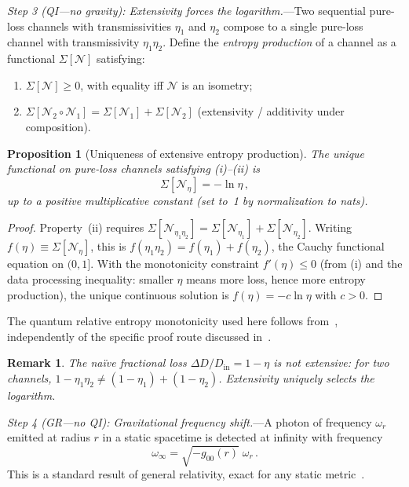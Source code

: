 \documentclass[aps,prd,preprint,superscriptaddress,longbibliography]{revtex4-2}
\newtheorem{proposition}[theorem]{Proposition}
\newtheorem*{remark}{Remark}
\newcommand{\chan}{\mathcal{N}}
\begin{document}
\emph{Step 3 (QI---no gravity): Extensivity forces the
logarithm.}---Two sequential pure-loss channels with
transmissivities $\eta_1$ and $\eta_2$ compose to a single
pure-loss channel with transmissivity $\eta_1\eta_2$.
Define the \emph{entropy production} of a channel as a functional
$\Sigma[\chan]$ satisfying:
\begin{enumerate}
  \item[(i)] $\Sigma[\chan] \geq 0$, with equality iff
    $\chan$ is an isometry;
  \item[(ii)] $\Sigma[\chan_2\circ\chan_1]
    = \Sigma[\chan_1] + \Sigma[\chan_2]$
    (extensivity / additivity under composition).
\end{enumerate}
\begin{proposition}[Uniqueness of extensive entropy production]
\label{prop:extensivity}
The unique functional on pure-loss channels satisfying (i)--(ii) is
\begin{equation}
  \Sigma[\chan_\eta] = -\ln\eta\,,
  \label{eq:Sigma_unique}
\end{equation}
up to a positive multiplicative constant (set to~1 by
normalization to nats).
\end{proposition}
\begin{proof}
Property~(ii) requires $\Sigma[\chan_{\eta_1\eta_2}]
= \Sigma[\chan_{\eta_1}] + \Sigma[\chan_{\eta_2}]$.
Writing $f(\eta) \equiv \Sigma[\chan_\eta]$, this is
$f(\eta_1\eta_2) = f(\eta_1) + f(\eta_2)$, the Cauchy
functional equation on $(0,1]$.  With the monotonicity
constraint $f'(\eta) \leq 0$ (from (i) and the data
processing inequality: smaller $\eta$ means more loss,
hence more entropy production), the unique continuous
solution is $f(\eta) = -c\ln\eta$ with $c > 0$.
\end{proof}

The quantum relative entropy monotonicity used here follows from~\cite{Lindblad1975,Uhlmann1977}, independently of the specific proof route discussed in~\cite{Petz1988}.

\begin{remark}
The na\"ive fractional loss $\Delta D/D_{\mathrm{in}} = 1 - \eta$
is \emph{not} extensive: for two channels,
$1 - \eta_1\eta_2 \neq (1-\eta_1) + (1-\eta_2)$.
Extensivity uniquely selects the logarithm.
\end{remark}

\emph{Step 4 (GR---no QI): Gravitational frequency shift.}---A photon
of frequency $\omega_r$ emitted at radius $r$ in a static spacetime
is detected at infinity with frequency
\begin{equation}
  \omega_\infty = \sqrt{-g_{00}(r)}\;\omega_r\,.
  \label{eq:freq_shift}
\end{equation}
This is a standard result of general relativity, exact for any
static metric~\cite{MTW1973}.
\end{document}

